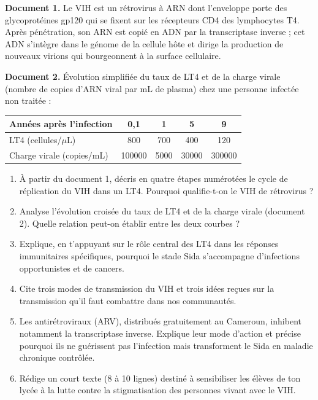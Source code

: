 \documentclass[11pt]{article}
\begin{document}
\begin{exercice}
\textbf{Document 1.} Le VIH est un rétrovirus à ARN dont l'enveloppe porte des glycoprotéines gp120 qui se fixent sur les récepteurs CD4 des lymphocytes T4. Après pénétration, son ARN est copié en ADN par la transcriptase inverse ; cet ADN s'intègre dans le génome de la cellule hôte et dirige la production de nouveaux virions qui bourgeonnent à la surface cellulaire.

\textbf{Document 2.} Évolution simplifiée du taux de LT4 et de la charge virale (nombre de copies d'ARN viral par mL de plasma) chez une personne infectée non traitée :
\begin{center}
\begin{tabular}{|l|c|c|c|c|}
\hline
\rowcolor{popblueL} Années après l'infection & 0,1 & 1 & 5 & 9 \\
\hline
LT4 (cellules/$\mu$L) & 800 & 700 & 400 & 120 \\
\hline
Charge virale (copies/mL) & \num{100000} & \num{5000} & \num{30000} & \num{300000} \\
\hline
\end{tabular}
\end{center}
\begin{enumerate}
\item À partir du document 1, décris en quatre étapes numérotées le cycle de réplication du VIH dans un LT4. Pourquoi qualifie-t-on le VIH de rétrovirus ?
\item Analyse l'évolution croisée du taux de LT4 et de la charge virale (document 2). Quelle relation peut-on établir entre les deux courbes ?
\item Explique, en t'appuyant sur le rôle central des LT4 dans les réponses immunitaires spécifiques, pourquoi le stade Sida s'accompagne d'infections opportunistes et de cancers.
\item Cite trois modes de transmission du VIH et trois idées reçues sur la transmission qu'il faut combattre dans nos communautés.
\item Les antirétroviraux (ARV), distribués gratuitement au Cameroun, inhibent notamment la transcriptase inverse. Explique leur mode d'action et précise pourquoi ils ne guérissent pas l'infection mais transforment le Sida en maladie chronique contrôlée.
\item Rédige un court texte (8 à 10 lignes) destiné à sensibiliser les élèves de ton lycée à la lutte contre la stigmatisation des personnes vivant avec le VIH.
\end{enumerate}
\end{exercice}
\end{document}
